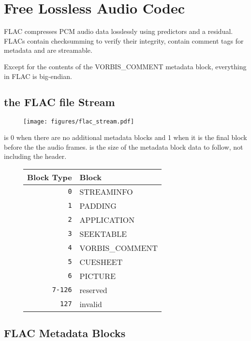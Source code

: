 
\chapter{Free Lossless Audio Codec}
FLAC compresses PCM audio data losslessly using predictors and a
residual.
FLACs contain checksumming to verify their integrity, contain comment tags for
metadata and are streamable.

Except for the contents of the VORBIS\_COMMENT metadata block, everything in FLAC is big-endian.

\section{the FLAC file Stream}
\begin{figure}[h]
\texttt{[image: figures/flac\_stream.pdf]}
\end{figure}
\par
\noindent
{} is 0 when there are no additional metadata blocks and 1 when
it is the final block before the the audio frames.
 is the size of the metadata block data to follow,
not including the header.
\begin{figure}[h]
\begin{tabular}{| r | l |}
\hline
Block Type & Block \\
\hline
\texttt{0} & STREAMINFO \\
\texttt{1} & PADDING \\
\texttt{2} & APPLICATION \\
\texttt{3} & SEEKTABLE \\
\texttt{4} & VORBIS\_COMMENT \\
\texttt{5} & CUESHEET \\
\texttt{6} & PICTURE \\
\texttt{7-126} & reserved \\
\texttt{127} & invalid \\
\hline
\end{tabular}
\end{figure}

\pagebreak

\section{FLAC Metadata Blocks}


